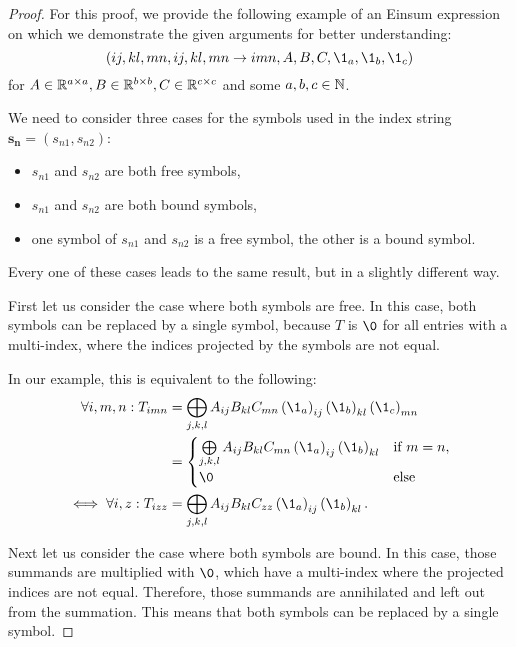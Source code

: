 \begin{proof}
    \small
    For this proof, we provide the following example of an Einsum expression on which we demonstrate the given arguments for better understanding:
    $$(ij, kl, mn, ij, kl, mn \rightarrow imn, A, B, C, \1_a, \1_b, \1_c)$$
    for $A \in \mathbb{R}^{a \times a}, B \in \mathbb{R}^{b \times b}, C \in \mathbb{R}^{c \times c}$ and some $a,b,c \in \mathbb{N}$.

    We need to consider three cases for the symbols used in the index string $\bm{s_n} = (s_{n1}, s_{n2})$:
    \begin{itemize}
        \item $s_{n1}$ and $s_{n2}$ are both free symbols,
        \item $s_{n1}$ and $s_{n2}$ are both bound symbols,
        \item one symbol of $s_{n1}$ and $s_{n2}$ is a free symbol, the other is a bound symbol.
    \end{itemize}
    Every one of these cases leads to the same result, but in a slightly different way.

    First let us consider the case where both symbols are free.
    In this case, both symbols can be replaced by a single symbol,
    because $T$ is $\0$ for all entries with a multi-index,
    where the indices projected by the symbols are not equal.

    In our example, this is equivalent to the following:
    \begin{align*}
        \forall i,m,n: T_{imn}    & = \bigoplus\limits_{j,k,l} A_{ij} B_{kl} C_{mn} \left(\1_a\right)_{ij} \left(\1_b\right)_{kl} \left(\1_c\right)_{mn} \\
                                  & = \begin{cases}
            \bigoplus\limits_{j,k,l} A_{ij} B_{kl} C_{mn} \left(\1_a\right)_{ij} \left(\1_b\right)_{kl} & \text{if $m = n$}, \\
            \0                                                                                          & \text{else}
        \end{cases}                                                                                          \\
        \iff \forall i,z: T_{izz} & = \bigoplus\limits_{j,k,l} A_{ij} B_{kl} C_{zz} \left(\1_a\right)_{ij} \left(\1_b\right)_{kl}.
    \end{align*}

    Next let us consider the case where both symbols are bound.
    In this case, those summands are multiplied with $\0$,
    which have a multi-index where the projected indices are not equal.
    Therefore, those summands are annihilated and left out from the summation.
    This means that both symbols can be replaced by a single symbol.


\end{proof}
